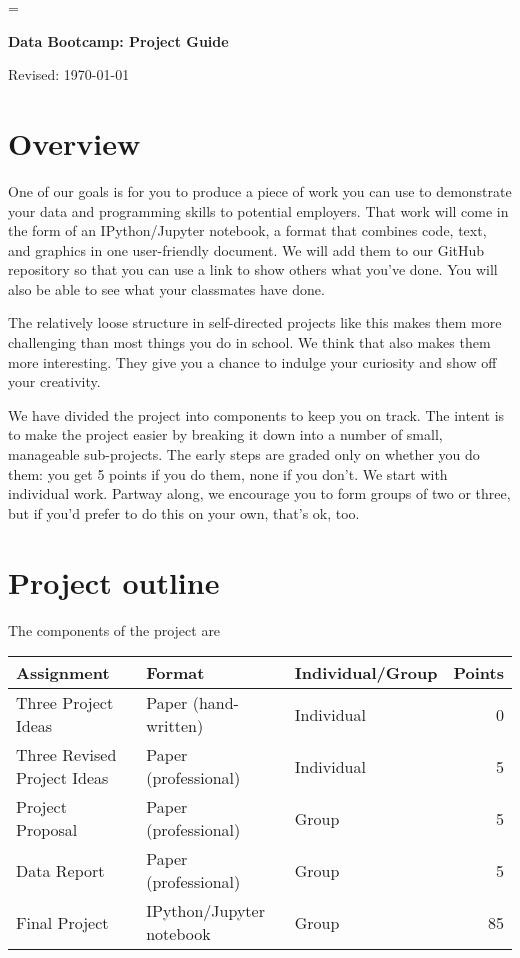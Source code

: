 \documentclass[11pt]{article}
\begin{document}
\parskip=\bigskipamount
\parindent=0.0in
\thispagestyle{empty}


\bigskip\bigskip
\centerline{\Large \bf Data Bootcamp:  Project Guide}
\centerline{Revised: \today}

\section*{Overview}

One of our goals is for you to produce a piece of work you can use
to demonstrate your data and programming skills to potential employers.
That work will come in the form of an IPython/Jupyter notebook,
a format that combines code, text, and graphics in one user-friendly document.
We will add them to our GitHub repository so that
you can use a link to show others what you've done.
You will also be able to see what your classmates have done.

The relatively loose structure in self-directed projects like this
makes them more challenging than most things you do in school.
We think that also makes them more interesting.
They give you a chance to
indulge your curiosity and show off your creativity.

We have divided the project into components to keep you on track.
The intent is to make the project easier by breaking it down into a number
of small, manageable sub-projects.
The early steps are graded only on whether you do them:
you get 5 points if you do them, none if you don't.
We start with individual work.  Partway along, we encourage you to form groups
of two or three, but if you'd prefer to do this on your own,
that's ok, too.


\section*{Project outline}

The components of the project are
%
\begin{center}
\begin{tabular}{lllr}
\toprule
Assignment                  & Format  & Individual/Group &  Points \\
\midrule
Three Project Ideas         & Paper (hand-written)  & Individual  & 0  \\
Three Revised Project Ideas & Paper (professional)  & Individual  & 5  \\
Project Proposal            & Paper (professional)  & Group       & 5  \\
Data Report                 & Paper (professional)  & Group       & 5  \\
Final Project               & IPython/Jupyter notebook      & Group       & 85 \\
\bottomrule
\end{tabular}
\end{center}
\end{document}
